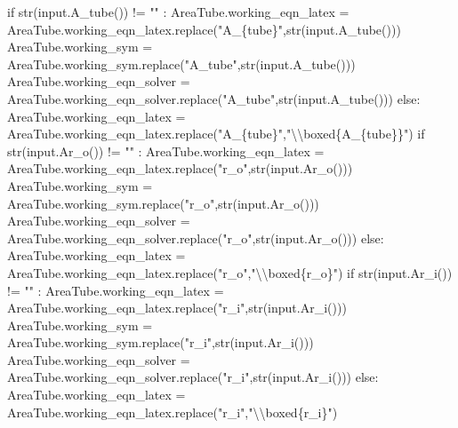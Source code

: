 \documentclass[
  letterpaper,
  DIV=11,
  numbers=noendperiod]{scrreprt}
\newenvironment{Shaded}{\begin{snugshade}}{\end{snugshade}}
\newcommand{\NormalTok}[1]{\textcolor[rgb]{0.00,0.23,0.31}{#1}}
\begin{document}
\begin{Shaded}
\begin{Highlighting}[]
\NormalTok{            if str(input.A\_tube()) != "" : }
\NormalTok{                AreaTube.working\_eqn\_latex = AreaTube.working\_eqn\_latex.replace("A\_\{tube\}",str(input.A\_tube()))}
\NormalTok{                AreaTube.working\_sym = AreaTube.working\_sym.replace("A\_tube",str(input.A\_tube()))}
\NormalTok{                AreaTube.working\_eqn\_solver = AreaTube.working\_eqn\_solver.replace("A\_tube",str(input.A\_tube()))}
\NormalTok{            else:}
\NormalTok{                AreaTube.working\_eqn\_latex = AreaTube.working\_eqn\_latex.replace("A\_\{tube\}","\textbackslash{}\textbackslash{}boxed\{A\_\{tube\}\}")}
\NormalTok{            if str(input.Ar\_o()) != "" : }
\NormalTok{                AreaTube.working\_eqn\_latex = AreaTube.working\_eqn\_latex.replace("r\_o",str(input.Ar\_o()))}
\NormalTok{                AreaTube.working\_sym = AreaTube.working\_sym.replace("r\_o",str(input.Ar\_o()))}
\NormalTok{                AreaTube.working\_eqn\_solver = AreaTube.working\_eqn\_solver.replace("r\_o",str(input.Ar\_o()))}
\NormalTok{            else:}
\NormalTok{                AreaTube.working\_eqn\_latex = AreaTube.working\_eqn\_latex.replace("r\_o","\textbackslash{}\textbackslash{}boxed\{r\_o\}")}
\NormalTok{            if str(input.Ar\_i()) != "" : }
\NormalTok{                AreaTube.working\_eqn\_latex = AreaTube.working\_eqn\_latex.replace("r\_i",str(input.Ar\_i()))}
\NormalTok{                AreaTube.working\_sym = AreaTube.working\_sym.replace("r\_i",str(input.Ar\_i()))}
\NormalTok{                AreaTube.working\_eqn\_solver = AreaTube.working\_eqn\_solver.replace("r\_i",str(input.Ar\_i()))}
\NormalTok{            else:}
\NormalTok{                AreaTube.working\_eqn\_latex = AreaTube.working\_eqn\_latex.replace("r\_i","\textbackslash{}\textbackslash{}boxed\{r\_i\}")}
        

\end{Highlighting}
\end{Shaded}
\end{document}
